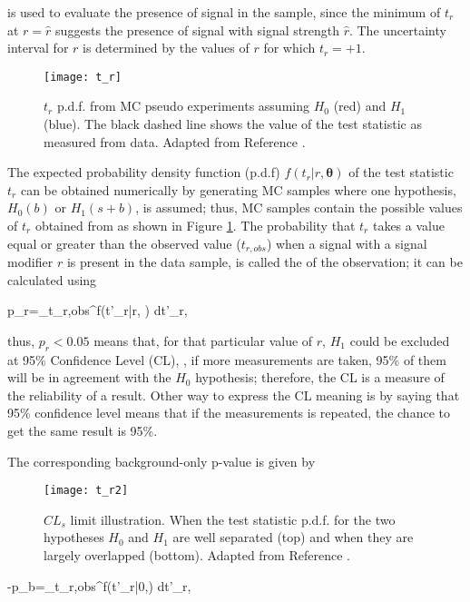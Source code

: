 \noindent is used to evaluate the presence of signal in the sample, since the minimum of $t_r$ at $r=\hat r$ suggests the presence of signal with signal strength $\hat r$. The uncertainty interval for $r$ is determined by the values of $r$ for which $t_r=+1$. 

\begin{figure}[!h]
  \centering
  \texttt{[image: t\_r]}
  \caption[$t_r$ p.d.f. assuming each $H_0$ and $H_1$]{ $t_r$ p.d.f. from MC pseudo experiments assuming $H_0$ (red) and $H_1$ (blue). The black dashed line shows the value of the test statistic as measured from data. Adapted from Reference \cite{luca}.}\label{fig:t_r}
\end{figure}


The expected probability density function (p.d.f) $f({t_r|r,\bm{\theta}})$ of the test statistic $t_r$ can be obtained numerically by generating MC samples where one hypothesis, $H_0(b)$ or $H_1(s+b)$, is assumed; thus, MC samples contain the possible values of $t_r$ obtained from  as shown in Figure \ref{fig:t_r}. The probability that $t_r$ takes a value equal or greater than the observed value ($t_{r,obs}$) when a signal with a signal modifier $r$ is present in the data sample, is called the  of the observation; it can be calculated using 

\beqn
p_r=\int_{t_{r,obs}}^\infty f(t'_r|r, \bm{\theta}) dt'_r,
\eeqn

\noindent thus, $p_r < 0.05$ means that, for that particular value of $r$, $H_1$ could be excluded at 95\% Confidence Level (CL), \ie, if more measurements are taken, 95\% of them will be in agreement with the $H_0$ hypothesis; therefore, the CL is a measure of the reliability of a result. Other way to express the CL meaning is by saying that 95\% confidence level means that if the measurements is repeated, the chance to get the same result is 95\%.   

The corresponding background-only p-value is given by

\begin{figure}[!h]
  \centering
  \texttt{[image: t\_r2]}
  \caption[Illustration of the $CL_s$ limit.]{ $CL_s$ limit illustration. When the test statistic p.d.f. for the two hypotheses $H_0$ and $ H_1$ are well separated (top) and when they are largely overlapped (bottom). Adapted from Reference \cite{luca}.}\label{fig:t_r2}
\end{figure}

-p_b=\int_{t_{r,obs}}^\infty f(t'_r|0,\bm{\theta}) dt'_r,
\eeqn

